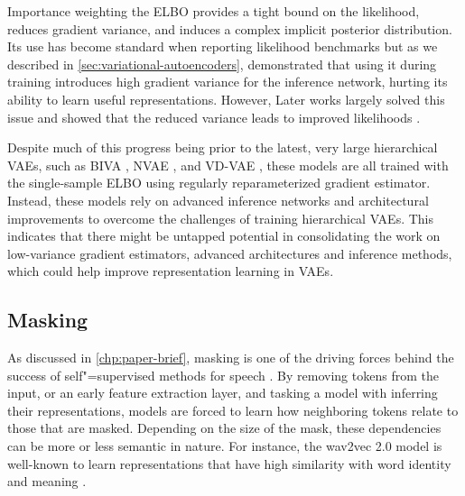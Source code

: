 Importance weighting the ELBO \parencite{burda_importance_2016} provides a tight bound on the likelihood, reduces gradient variance, and induces a complex implicit posterior distribution. 
Its use has become standard when reporting likelihood benchmarks but as we described in \cref{sec:variational-autoencoders}, \textcite{rainforth_tighter_2019} demonstrated that using it during training introduces high gradient variance for the inference network, hurting its ability to learn useful representations. However, Later works largely solved this issue and showed that the reduced variance leads to improved likelihoods \parencite{roeder_sticking_2017,tucker_doubly_2019,bauer_generalized_2021}. 

Despite much of this progress being prior to the latest, very large hierarchical VAEs, such as BIVA \parencite{maaloe_biva_2019}, NVAE \parencite{vahdat_nvae_2020}, and VD-VAE \parencite{child_very_2021}, these models are all trained with the single-sample ELBO using regularly reparameterized gradient estimator. Instead, these models rely on advanced inference networks \parencite{maaloe_biva_2019} and architectural improvements \parencite{vahdat_nvae_2020, child_very_2021} to overcome the challenges of training hierarchical VAEs. 
This indicates that there might be untapped potential in consolidating the work on low-variance gradient estimators, advanced architectures and inference methods, which could help improve representation learning in VAEs.


\subsection{Masking} 
As discussed in \cref{chp:paper-brief}, masking is one of the driving forces behind the success of self"=supervised methods for speech \parencite{devlin_bert_2018,baevski_wav2vec_2020}. By removing tokens from the input, or an early feature extraction layer, and tasking a model with inferring their representations, models are forced to learn how neighboring tokens relate to those that are masked. Depending on the size of the mask, these dependencies can be more or less semantic in nature. For instance, the wav2vec 2.0 model is well-known to learn representations that have high similarity with word identity and meaning \parencite{pasad_layerwise_2021}. 

